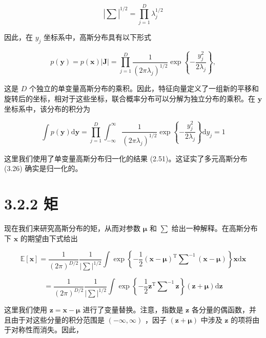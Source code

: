 \documentclass[10pt]{article}
\begin{document}
\[
{\left| \mathbf{\sum }\right| }^{1/2} = \mathop{\prod }\limits_{{j = 1}}^{D}{\lambda }_{j}^{1/2} \tag{3.38}
\]

因此，在 \({y}_{j}\) 坐标系中，高斯分布具有以下形式

\[
p\left( \mathbf{y}\right)  = p\left( \mathbf{x}\right) \left| \mathbf{J}\right|  = \mathop{\prod }\limits_{{j = 1}}^{D}\frac{1}{{\left( 2\pi {\lambda }_{j}\right) }^{1/2}}\exp \left\{  {-\frac{{y}_{j}^{2}}{2{\lambda }_{j}}}\right\}  , \tag{3.39}
\]

这是 \(D\) 个独立的单变量高斯分布的乘积。因此，特征向量定义了一组新的平移和旋转后的坐标，相对于这些坐标，联合概率分布可以分解为独立分布的乘积。在 \(\mathbf{y}\) 坐标系中，该分布的积分为

\[
\int p\left( \mathbf{y}\right) \mathrm{d}\mathbf{y} = \mathop{\prod }\limits_{{j = 1}}^{D}{\int }_{-\infty }^{\infty }\frac{1}{{\left( 2\pi {\lambda }_{j}\right) }^{1/2}}\exp \left\{  {-\frac{{y}_{j}^{2}}{2{\lambda }_{j}}}\right\}  \mathrm{d}{y}_{j} = 1 \tag{3.40}
\]

这里我们使用了单变量高斯分布归一化的结果 (2.51)。这证实了多元高斯分布 (3.26) 确实是归一化的。

\section*{3.2.2 矩}

现在我们来研究高斯分布的矩，从而对参数 \(\mathbf{\mu }\) 和 \(\mathbf{\sum }\) 给出一种解释。在高斯分布下 \(\mathbf{x}\) 的期望由下式给出

\[
\mathbb{E}\left\lbrack  \mathbf{x}\right\rbrack   = \frac{1}{{\left( 2\pi \right) }^{D/2}}\frac{1}{{\left| \mathbf{\sum }\right| }^{1/2}}\int \exp \left\{  {-\frac{1}{2}{\left( \mathbf{x} - \mathbf{\mu }\right) }^{\mathrm{T}}{\mathbf{\sum }}^{-1}\left( {\mathbf{x} - \mathbf{\mu }}\right) }\right\}  \mathbf{x}\mathrm{d}\mathbf{x}
\]

\[
= \frac{1}{{\left( 2\pi \right) }^{D/2}}\frac{1}{{\left| \mathbf{\sum }\right| }^{1/2}}\int \exp \left\{  {-\frac{1}{2}{\mathbf{z}}^{\mathrm{T}}{\mathbf{\sum }}^{-1}\mathbf{z}}\right\}  \left( {\mathbf{z} + \mathbf{\mu }}\right) \mathrm{d}\mathbf{z} \tag{3.41}
\]

这里我们使用 \(\mathbf{z} = \mathbf{x} - \mathbf{\mu }\) 进行了变量替换。注意，指数是 \(\mathbf{z}\) 各分量的偶函数，并且由于对这些分量的积分范围是 \(\left( {-\infty ,\infty }\right)\) ，因子 \(\left( {\mathbf{z} + \mathbf{\mu }}\right)\) 中涉及 \(\mathbf{z}\) 的项将由于对称性而消失。因此，
\end{document}
